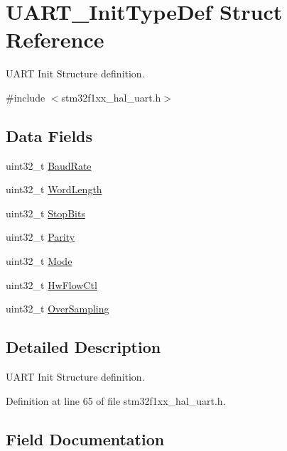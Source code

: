 \hypertarget{struct_u_a_r_t___init_type_def}{}\section{U\+A\+R\+T\+\_\+\+Init\+Type\+Def Struct Reference}
\label{struct_u_a_r_t___init_type_def}


U\+A\+RT Init Structure definition.  




{\ttfamily \#include $<$stm32f1xx\+\_\+hal\+\_\+uart.\+h$>$}

\subsection*{Data Fields}
\begin{DoxyCompactItemize}
\item 
uint32\+\_\+t \hyperlink{struct_u_a_r_t___init_type_def_aaad609733f3fd8146c8745e953a91b2a}{Baud\+Rate}
\item 
uint32\+\_\+t \hyperlink{struct_u_a_r_t___init_type_def_ae5e60b9a021fe0009588fc86c7584a5a}{Word\+Length}
\item 
uint32\+\_\+t \hyperlink{struct_u_a_r_t___init_type_def_a8394ba239444e3e5fe1ada1c37cb1019}{Stop\+Bits}
\item 
uint32\+\_\+t \hyperlink{struct_u_a_r_t___init_type_def_a1d60a99b8f3965f01ab23444b154ba79}{Parity}
\item 
uint32\+\_\+t \hyperlink{struct_u_a_r_t___init_type_def_a0ffc93ec511ed9cf1663f6939bd3e839}{Mode}
\item 
uint32\+\_\+t \hyperlink{struct_u_a_r_t___init_type_def_a0a933d213b17470c582c8fec23a24d09}{Hw\+Flow\+Ctl}
\item 
uint32\+\_\+t \hyperlink{struct_u_a_r_t___init_type_def_a35770b237370fda7fd0fabad22898490}{Over\+Sampling}
\end{DoxyCompactItemize}


\subsection{Detailed Description}
U\+A\+RT Init Structure definition. 

Definition at line 65 of file stm32f1xx\+\_\+hal\+\_\+uart.\+h.



\subsection{Field Documentation}
\mbox{\label{struct_u_a_r_t___init_type_def_aaad609733f3fd8146c8745e953a91b2a}} 
